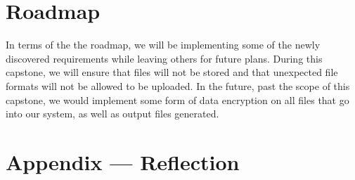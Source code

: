 \documentclass{article}
\begin{document}
\section{Roadmap}


In terms of the the roadmap, we will be implementing some of the newly discovered requirements while leaving others for future plans. During this capstone,
we will ensure that files will not be stored and that unexpected file formats will not be allowed to be uploaded. In the future, past the scope of this capstone,
we would implement some form of data encryption on all files that go into our system, as well as output files generated.



\newpage{}

\section*{Appendix --- Reflection}



\end{document}
